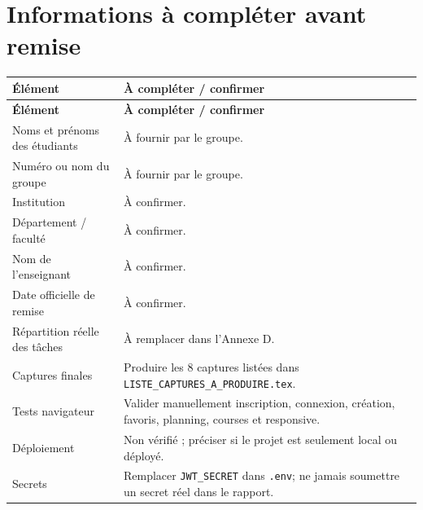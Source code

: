 \documentclass[12pt,a4paper]{article}
\begin{document}
\section*{Informations à compléter avant remise}
\begin{longtable}{p{5cm}p{9cm}}
\toprule
\textbf{Élément} & \textbf{À compléter / confirmer} \\
\midrule
\endfirsthead
\toprule
\textbf{Élément} & \textbf{À compléter / confirmer} \\
\midrule
\endhead
Noms et prénoms des étudiants & À fournir par le groupe. \\
Numéro ou nom du groupe & À fournir par le groupe. \\
Institution & À confirmer. \\
Département / faculté & À confirmer. \\
Nom de l'enseignant & À confirmer. \\
Date officielle de remise & À confirmer. \\
Répartition réelle des tâches & À remplacer dans l'Annexe D. \\
Captures finales & Produire les 8 captures listées dans \texttt{LISTE\_CAPTURES\_A\_PRODUIRE.tex}. \\
Tests navigateur & Valider manuellement inscription, connexion, création, favoris, planning, courses et responsive. \\
Déploiement & Non vérifié ; préciser si le projet est seulement local ou déployé. \\
Secrets & Remplacer \texttt{JWT\_SECRET} dans \texttt{.env}; ne jamais soumettre un secret réel dans le rapport. \\
\bottomrule
\end{longtable}
\end{document}
